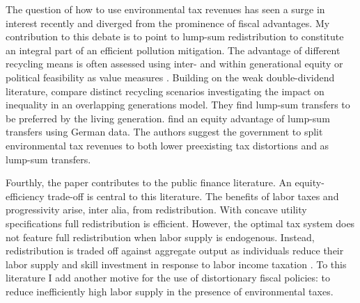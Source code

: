 The question of how to use environmental tax revenues has seen a surge in interest recently and diverged from the prominence of fiscal advantages. 
My contribution to this debate is to point to lump-sum redistribution to constitute an integral part of an efficient pollution mitigation. %
The advantage of different recycling means is often assessed using inter- and within generational equity or political feasibility as value measures \citep{Carattini2018, Goulder2019IncomeGroups, VANDERPLOEG2022103966, Kotlikoff2021MakingWin, Carbone2013DeficitImpacts}. Building on the weak double-dividend literature, \cite{Fried2018TheGenerations} compare distinct recycling scenarios investigating the impact on inequality in an overlapping generations model. They find lump-sum transfers to be preferred by the  living generation.  \cite{VANDERPLOEG2022103966} find an equity advantage of lump-sum transfers using German data. The authors suggest the government to split environmental tax revenues to both lower preexisting tax distortions and as lump-sum transfers. %


Fourthly, the paper contributes to the public finance literature.
An equity-efficiency trade-off is central to this literature.  The benefits of labor taxes and progressivity arise, inter alia, from redistribution. %
With concave utility specifications full redistribution is efficient. However, the optimal tax system does not feature full redistribution when labor supply is endogenous. Instead, redistribution is traded off against aggregate output as individuals reduce their labor supply and skill investment in response to labor income taxation \citep{Heathcote2017OptimalFramework, Conesa2009TaxingAll, Domeij2004OnTaxes}.
To this literature I add another motive for the use of distortionary fiscal policies: to reduce inefficiently high labor supply in the presence of environmental taxes. 


